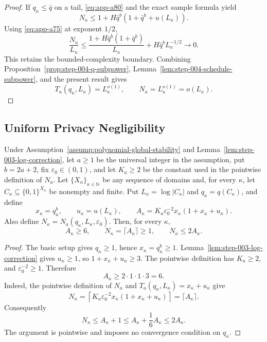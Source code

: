\begin{proof}
If \(q_\kappa\leq\bar q\) on a tail, \eqref{eq:app-a80} and the exact sample
formula yield
\begin{equation}
N_\kappa
\leq1+H\bar q^b
(1+\bar q^b+u(L_\kappa)).
\label{eq:app-a90}
\end{equation}
Using \eqref{eq:app-a75} at exponent \(1/2\),
\begin{equation}
\frac{N_\kappa}{L_\kappa}
\leq
\frac{1+H\bar q^b(1+\bar q^b)}{L_\kappa}
+H\bar q^bL_\kappa^{-1/2}
\longrightarrow0.
\label{eq:app-a91}
\end{equation}
This retains the bounded-complexity boundary.  Combining
Proposition~\ref{prop:step-004-q-subpower},
Lemma~\ref{lem:step-004-schedule-subpower}, and the present result
gives
\begin{equation}
T_a(q_\kappa,L_\kappa)=L_\kappa^{o(1)},\qquad
N_\kappa=L_\kappa^{o(1)}=o(L_\kappa).
\label{eq:app-a92}
\end{equation}
\end{proof}

\subsection{Uniform Privacy Negligibility}\label{app:privacy-negligibility}

\begin{lemma}
\label{lem:step-005-ceiling}
Under Assumption~\ref{assump:polynomial-global-stability}
and Lemma~\ref{lem:step-003-log-correction}, let \(a\geq1\) be the
universal integer in the assumption, put \(b=2a+2\), fix
\(\varepsilon_0\in(0,1)\), and let \(K_a\geq2\) be the constant used
in the pointwise definition of \(N_a\).  Let
\(\{X_\kappa\}_{\kappa\in\mathbb N}\) be any sequence of domains and,
for every \(\kappa\), let
\(C_\kappa\subseteq\{0,1\}^{X_\kappa}\) be nonempty and finite.  Put
\(L_\kappa=\log|C_\kappa|\) and \(q_\kappa=q(C_\kappa)\), and define
\[
x_\kappa=q_\kappa^b,\qquad
u_\kappa=u(L_\kappa),\qquad
A_\kappa=
K_a\varepsilon_0^{-2}
x_\kappa(1+x_\kappa+u_\kappa).
\]
Also define
\(N_\kappa=N_a(q_\kappa,L_\kappa,\varepsilon_0)\).  Then,
for every \(\kappa\),
\begin{equation}
A_\kappa\geq6,\qquad
N_\kappa=\lceil A_\kappa\rceil\geq1,\qquad
N_\kappa\leq2A_\kappa.
\label{eq:app-a93}
\end{equation}
\end{lemma}

\begin{proof}
The basic setup gives \(q_\kappa\geq1\), hence
\(x_\kappa=q_\kappa^b\geq1\).
Lemma~\ref{lem:step-003-log-correction} gives \(u_\kappa\geq1\), so
\(1+x_\kappa+u_\kappa\geq3\).
The pointwise definition has \(K_a\geq2\), and
\(\varepsilon_0^{-2}\geq1\).  Therefore
\[
A_\kappa
\geq2\cdot1\cdot1\cdot3=6.
\]
Indeed, the pointwise definition of \(N_a\) and
\(T_a(q_\kappa,L_\kappa)=x_\kappa+u_\kappa\) give
\[
N_\kappa
=\left\lceil
K_a\varepsilon_0^{-2}x_\kappa
(1+x_\kappa+u_\kappa)
\right\rceil
=\lceil A_\kappa\rceil.
\]
Consequently
\[
N_\kappa
\leq A_\kappa+1
\leq A_\kappa+\frac16A_\kappa
\leq2A_\kappa.
\]
The argument is pointwise and imposes no convergence condition on
\(q_\kappa\).
\end{proof}

